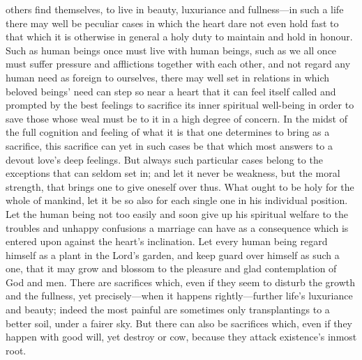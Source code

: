 \documentclass[12pt,a4paper]{book}
\begin{document}
others find themselves, to live in beauty, luxuriance and fullness---in such
a life there may well be peculiar cases in which the heart dare not even
hold fast to that which it is otherwise in general a holy duty to maintain
and hold in honour. Such as human beings once must live with human beings,
such as we all once must suffer pressure and afflictions together with each
other, and not regard any human need as foreign to ourselves, there may
well set in relations in which beloved beings' need can step so near a
heart that it can feel itself called and prompted by the best feelings to
sacrifice its inner spiritual well-being in order to save those whose weal
must be to it in a high degree of concern. In the midst of the full
cognition and feeling of what it is that one determines to bring as a
sacrifice, this sacrifice can yet in such cases be that which most answers
to a devout love's deep feelings. But always such particular cases belong
to the exceptions that can seldom set in; and let it never be weakness, but
the moral strength, that brings one to give oneself over thus. What ought
to be holy for the whole of mankind, let it be so also for each single one
in his individual position. Let the human being not too easily and soon
give up his spiritual welfare to the troubles and unhappy confusions a
marriage can have as a consequence which is entered upon against the
heart's inclination. Let every human being regard himself as a plant in the
Lord's garden, and keep guard over himself as such a one, that it may grow
and blossom to the pleasure and glad contemplation of God and men. There
are sacrifices which, even if they seem to disturb the growth and the
fullness, yet precisely---when it happens rightly---further life's
luxuriance and beauty; indeed the most painful are sometimes only
transplantings to a better soil, under a fairer sky. But there can also be
sacrifices which, even if they happen with good will, yet destroy or cow,
because they attack existence's inmost root.
\end{document}
